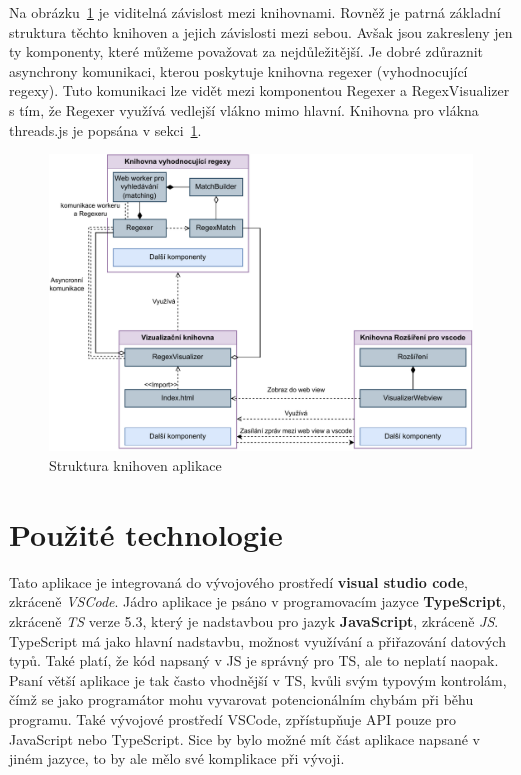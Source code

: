 Na obrázku~\ref{fig:ARCH} je viditelná závislost mezi knihovnami. 
Rovněž je patrná základní struktura těchto knihoven a jejich závislosti mezi sebou.
Avšak jsou zakresleny jen ty komponenty, které můžeme považovat za nejdůležitější. 
Je dobré zdůraznit asynchrony komunikaci, kterou poskytuje knihovna regexer (vyhodnocující regexy).
Tuto komunikaci lze vidět mezi komponentou Regexer a RegexVisualizer s tím, že Regexer využívá vedlejší vlákno mimo hlavní. 
Knihovna pro vlákna threads.js je popsána v sekci~\ref{sec:USEDtech}.

\begin{figure}[!h]
	\centering
	\includegraphics[width=.9\textwidth]{Figures/BP-Arch.pdf}
	\caption{Struktura knihoven aplikace}
	\label{fig:ARCH}
\end{figure}

\newpage

\section{Použité technologie}\label{sec:USEDtech}
Tato aplikace je integrovaná do vývojového prostředí \textbf{visual studio code}, 
zkráceně \textit{VSCode}. Jádro aplikace je psáno v programovacím jazyce \textbf{TypeScript}, zkráceně \textit{TS} verze 5.3, který je nadstavbou
pro jazyk \textbf{JavaScript}, zkráceně \textit{JS}. TypeScript má jako hlavní nadstavbu, možnost využívání a přiřazování datových typů.
Také platí, že kód napsaný v JS je správný pro TS, ale to neplatí naopak.
Psaní větší aplikace je tak často vhodnější v TS, 
kvůli svým typovým kontrolám, čímž se jako programátor mohu vyvarovat potencionálním chybám při běhu programu.
Také vývojové prostředí VSCode, zpřístupňuje API pouze pro JavaScript nebo TypeScript.
Sice by bylo možné mít část aplikace napsané v jiném jazyce, to by ale mělo své komplikace při vývoji.

